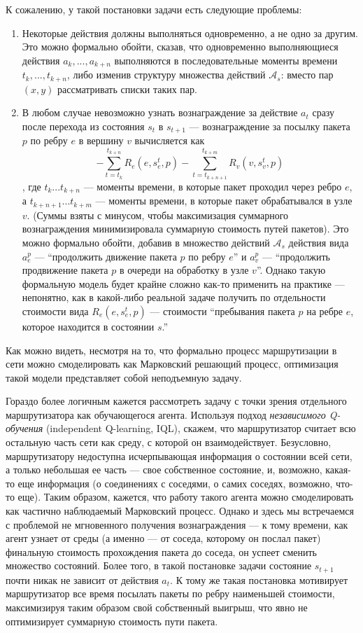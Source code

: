 \documentclass[]{itmo-student-thesis}
\begin{document}
К сожалению, у такой постановки задачи есть следующие проблемы:
\begin{enumerate}
\item Некоторые действия должны выполняться одновременно, а не одно за другим.
  Это можно формально обойти, сказав, что одновременно выполняющиеся действия
  $a_k, ... , a_{k+n}$ выполняются в последовательные моменты времени
  $t_k, ... , t_{k+n}$, либо изменив структуру множества действий
  $\mathcal{A}_s$: вместо пар $(x, y)$ рассматривать списки таких пар.
\item В любом случае невозможно узнать вознаграждение за действие $a_t$ сразу
  после перехода из состояния $s_t$ в $s_{t+1}$ --- вознаграждение за посылку
  пакета $p$ по ребру $e$ в вершину $v$ вычисляется как
  \[
  - \sum\limits_{t=t_k}^{t_{k+n}} {R_e(e, s_e^t, p)} -
  \sum\limits_{t=t_{k+n+1}}^{t_{k+m}} R_v(v, s_v^t, p)
  \]
  , где $t_k ... t_{k+n}$ --- моменты времени, в которые пакет проходил через
  ребро $e$, а $t_{k+n+1} ... t_{k+m}$ --- моменты времени, в которые пакет
  обрабатывался в узле $v$. (Суммы взяты с минусом, чтобы максимизация
  суммарного вознаграждения минимизировала суммарную стоимость путей пакетов).
  Это можно формально обойти, добавив в множество действий $\mathcal{A}_s$
  действия вида $a_e^p$ --- ``продолжить движение пакета
  $p$ по ребру $e$'' и $a_v^p$ --- ``продолжить продвижение пакета $p$ в очереди на
  обработку в узле $v$''. Однако такую формальную модель будет крайне сложно
  как-то применить на практике --- непонятно, как в какой-либо реальной задаче
  получить по отдельности стоимости вида $R_e(e, s_e^t, p)$ --- стоимости
  ``пребывания пакета $p$ на ребре $e$, которое находится в состоянии $s$.''
\end{enumerate}

Как можно видеть, несмотря на то, что формально процесс маршрутизации в сети
можно смоделировать как Марковский решающий процесс, оптимизация такой модели
представляет собой неподъемную задачу.

Гораздо более логичным кажется рассмотреть задачу с точки зрения отдельного
маршрутизатора как обучающегося агента. Используя подход \textit{независимого
  Q-обучения} (independent Q-learning, IQL)\cite{tan1993multi}, скажем, что
маршрутизатор считает всю остальную часть сети как среду, с которой он
взаимодействует. Безусловно, маршрутизатору недоступна исчерпывающая информация
о состоянии всей сети, а только небольшая ее часть --- свое собственное
состояние, и, возможно, какая-то еще информация (о соединениях с соседями, о
самих соседях, возможно, что-то еще). Таким образом, кажется, что работу такого
агента можно смоделировать как частично наблюдаемый Марковский процесс. Однако и
здесь мы встречаемся с проблемой не мгновенного получения вознаграждения --- к
тому времени, как агент узнает от среды (а именно --- от соседа, которому он
послал пакет) финальную стоимость прохождения пакета до соседа, он успеет
сменить множество состояний. Более того, в такой постановке задачи состояние
$s_{t+1}$ почти никак не зависит от действия $a_t$. К тому же такая постановка
мотивирует маршрутизатор все время посылать пакеты по ребру наименьшей
стоимости, максимизируя таким образом свой собственный выигрыш, что явно не
оптимизирует суммарную стоимость пути пакета.
\end{document}
